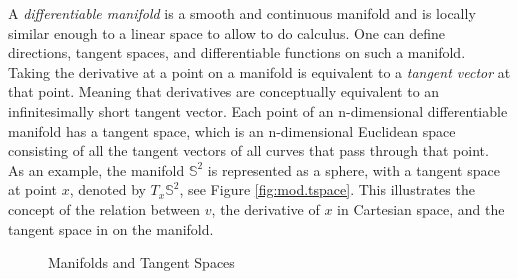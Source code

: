 A \textit{differentiable manifold} is a smooth and continuous manifold and is locally similar enough to a linear space to allow to do calculus. One can define directions, tangent spaces, and differentiable functions on such a manifold.\\ 
Taking the derivative at a point on a manifold is equivalent to a \textit{tangent vector} at that point. Meaning that derivatives are conceptually equivalent to an infinitesimally short tangent vector. 
Each point of an n-dimensional differentiable manifold has a tangent space, which is an n-dimensional Euclidean space consisting of all the tangent vectors of all curves that pass through that point. \\
As an example, the manifold $ \mathbb{S}^2 $ is represented as a sphere, with a tangent space at point $ x $, denoted by $ T_x\mathbb{S}^2 $, see Figure \ref{fig:mod.tspace}. 
This illustrates the concept of the relation between $ v $, the derivative of $ x $ in Cartesian space, and the tangent space in on the manifold.
\begin{figure}[h!]
	\centering
	\caption{Manifolds and Tangent Spaces\label{fig:}}
\end{figure}		

